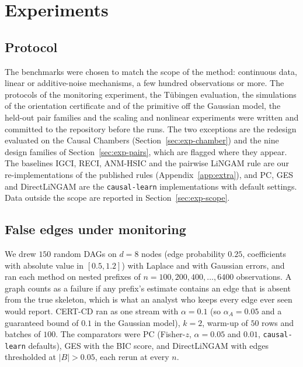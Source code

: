 
\section{Experiments}\label{sec:experiments}

\subsection{Protocol}\label{sec:protocol}

The benchmarks were chosen to match the scope of the method: continuous data,
linear or additive-noise mechanisms, a few hundred observations or more. The
protocols of the monitoring experiment, the Tübingen evaluation, the simulations
of the orientation certificate and of the primitive off the Gaussian model, the
held-out pair families and the scaling and nonlinear experiments were written and
committed to the repository before the runs. The two exceptions are the
redesign evaluated on the Causal Chambers (Section~\ref{sec:exp-chamber}) and the
nine design families of Section~\ref{sec:exp-pairs}, which are flagged where they
appear. The baselines IGCI, RECI, ANM-HSIC and the pairwise LiNGAM rule are our
re-implementations of the published rules (Appendix~\ref{app:extra}), and PC, GES
and DirectLiNGAM are the \texttt{causal-learn} implementations with default
settings. Data outside the scope are reported in Section~\ref{sec:exp-scope}.

\subsection{False edges under monitoring}
\label{sec:exp-monitoring}

We drew $150$ random DAGs on $d=8$ nodes (edge probability $0.25$,
coefficients with absolute value in $[0.5,1.2]$) with Laplace and with Gaussian
errors, and ran each method on nested prefixes of $n=100,200,400,\dots,6400$
observations. A graph counts as a failure if any prefix's estimate contains an
edge that is absent from the true skeleton, which is what an analyst who keeps
every edge ever seen would report. CERT-CD ran as one stream with
$\alpha=0.1$ (so $\alpha_A=0.05$ and a guaranteed bound of $0.1$ in the
Gaussian model), $k=2$, warm-up of $50$ rows and batches of $100$. The
comparators were PC (Fisher-$z$, $\alpha=0.05$ and $0.01$, \texttt{causal-learn}
defaults), GES with the BIC score, and DirectLiNGAM with edges thresholded at
$|B|>0.05$, each rerun at every $n$.

